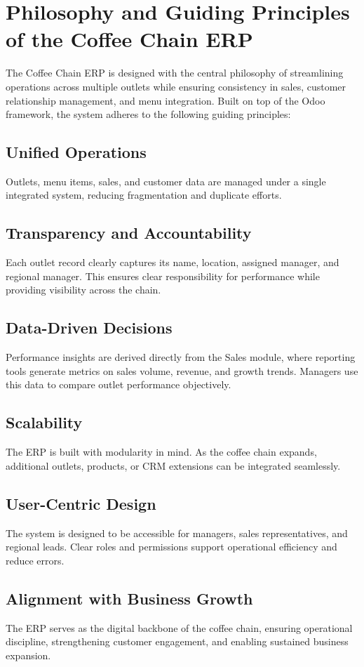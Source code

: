 \chapter{Philosophy and Guiding Principles of the Coffee Chain ERP}

The Coffee Chain ERP is designed with the central philosophy of 
streamlining operations across multiple outlets while ensuring 
consistency in sales, customer relationship management, and menu 
integration. Built on top of the Odoo framework, the system 
adheres to the following guiding principles:

\section*{Unified Operations}
Outlets, menu items, sales, and customer data are managed under a 
single integrated system, reducing fragmentation and duplicate 
efforts.

\section*{Transparency and Accountability}
Each outlet record clearly captures its name, location, assigned 
manager, and regional manager. This ensures clear responsibility 
for performance while providing visibility across the chain.

\section*{Data-Driven Decisions}
Performance insights are derived directly from the Sales module, 
where reporting tools generate metrics on sales volume, revenue, 
and growth trends. Managers use this data to compare outlet 
performance objectively.

\section*{Scalability}
The ERP is built with modularity in mind. As the coffee chain 
expands, additional outlets, products, or CRM extensions can be 
integrated seamlessly.

\section*{User-Centric Design}
The system is designed to be accessible for managers, sales 
representatives, and regional leads. Clear roles and permissions 
support operational efficiency and reduce errors.

\section*{Alignment with Business Growth}
The ERP serves as the digital backbone of the coffee chain, 
ensuring operational discipline, strengthening customer 
engagement, and enabling sustained business expansion.
